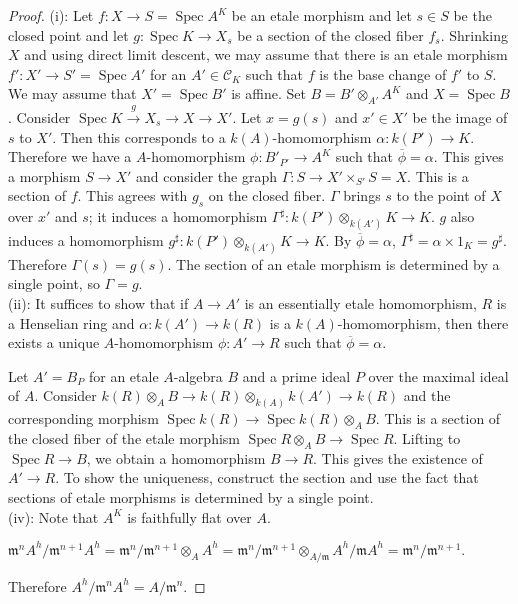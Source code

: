 \documentclass{article}
\theoremstyle{theorem}
\begin{document}
    \begin{proof}
        (i): Let $f : X \rightarrow S = \operatorname{Spec} A^K$ be an etale morphism and let $s \in S$ be the closed point and let $g: \operatorname{Spec} K \rightarrow X_s$ be a section of the closed fiber $f_s$. Shrinking $X$ and using direct limit descent, we may assume that there is an etale morphism $f' : X' \rightarrow S' = \operatorname{Spec} A'$ for an $A' \in \mathcal{C}_K$ such that $f$ is the base change of $f'$ to $S$. We may assume that $X' = \operatorname{Spec} B'$ is affine. Set $B = B' \otimes_{A'} A^K$ and $X = \operatorname{Spec} B$. Consider $\operatorname{Spec} K \xrightarrow{g} X_s \rightarrow X \rightarrow X'$. Let $x = g(s)$ and $x' \in X'$ be the image of $s$ to $X'$. Then this corresponds to a $k(A)$-homomorphism $\alpha : k(P') \rightarrow K$.
        Therefore we have a $A$-homomorphism $\phi : B'_{P'} \rightarrow A^K$ such that $\overline\phi = \alpha$. This gives a morphism $S \rightarrow X'$ and consider the graph $\Gamma : S \rightarrow X' \times_{S'} S = X$. This is a section of $f$. This agrees with $g_s$ on the closed fiber. $\Gamma$ brings $s$ to the point of $X$ over $x'$ and $s$; it induces a homomorphism $\Gamma^\sharp : k(P')\otimes_{k(A')} K \rightarrow K$. $g$ also induces a homomorphism $g^\sharp : k(P')\otimes_{k(A')} K \rightarrow K$. By $\overline\phi = \alpha$, $\Gamma^\sharp = \alpha \times 1_K = g^\sharp$. Therefore $\Gamma(s) = g(s)$. The section of an etale morphism is determined by a single point, so $\Gamma = g.$\\
        
        (ii): It suffices to show that if $A \rightarrow A'$ is an essentially etale homomorphism, $R$ is a Henselian ring and $\alpha : k(A') \rightarrow k(R)$ is a $k(A)$-homomorphism, then there exists a unique $A$-homomorphism $\phi : A' \rightarrow R$ such that $\overline\phi = \alpha$.
        
        Let $A' = B_P$ for an etale $A$-algebra $B$ and a prime ideal $P$ over the maximal ideal of $A$. Consider $k(R)\otimes_A B \rightarrow k(R)\otimes_{k(A)}k(A') \rightarrow k(R)$ and the corresponding morphism $\operatorname{Spec} k(R) \rightarrow \operatorname{Spec} k(R)\otimes_A B$. This is a section of the closed fiber of the etale morphism $\operatorname{Spec} R\otimes_A B \rightarrow \operatorname{Spec} R$. Lifting to $\operatorname{Spec} R \rightarrow B$, we obtain a homomorphism $B \rightarrow R$. This gives the existence of $A' \rightarrow R$. To show the uniqueness, construct the section and use the fact that sections of etale morphisms is determined by a single point.\\
        
        (iv): Note that $A^K$ is faithfully flat over $A$.
        
        $\mathfrak{m}^{n}A^h / \mathfrak{m}^{n+1} A^h = \mathfrak{m}^{n} / \mathfrak{m}^{n+1} \otimes_A A^h = \mathfrak{m}^{n} / \mathfrak{m}^{n+1} \otimes_{A/\mathfrak{m}} A^h / \mathfrak{m}A^h = \mathfrak{m}^{n} / \mathfrak{m}^{n+1}.$
        
        Therefore $A^h / \mathfrak{m}^{n}A^h = A/\mathfrak{m}^{n}.$
    \end{proof}
    
\end{document}
